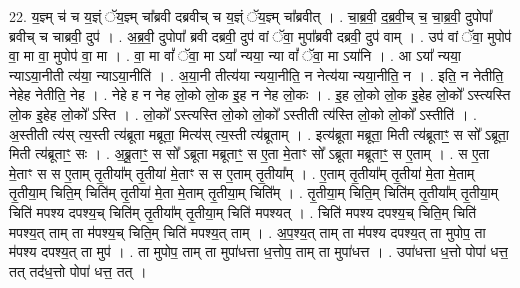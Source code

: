 \documentclass[17pt]{extarticle}
\begin{document}
22. य॒ज्ञ्म् च॑ च य॒ज्ञ्ं ॅय॒ज्ञ्म् चा᳚ब्रवी दब्रवीच् च य॒ज्ञ्ं ॅय॒ज्ञ्म् चा᳚ब्रवीत् । . चा॒ब्र॒वी॒ द॒ब्र॒वी॒च् च॒ चा॒ब्र॒वी॒ दुपोपा᳚ ब्रवीच् च चाब्रवी॒ दुप॑ । . अ॒ब्र॒वी॒ दुपोपा᳚ ब्रवी दब्रवी॒ दुप॑ वां ॅवा॒ मुपा᳚ब्रवी दब्रवी॒ दुप॑ वाम् । . उप॑ वां ॅवा॒ मुपोप॑ वा॒ मा वा॒ मुपोप॑ वा॒ मा । . वा॒ मा वां᳚ ॅवा॒ मा ऽया᳚ न्यया॒ न्या वां᳚ ॅवा॒ मा ऽया॑नि । . आ ऽया᳚ न्यया॒ न्याऽया॒नीती त्य॑या॒ न्याऽया॒नीति॑ । . अ॒या॒नी तीत्य॑या न्यया॒नीति॒ न नेत्य॑या न्यया॒नीति॒ न । . इति॒ न नेतीति॒ नेहेह नेतीति॒ नेह । . नेहे ह न नेह लो॒को लो॒क इ॒ह न नेह लो॒कः । . इ॒ह लो॒को लो॒क इ॒हेह लो॒को᳚ ऽस्त्यस्ति लो॒क इ॒हेह लो॒को᳚ ऽस्ति । . लो॒को᳚ ऽस्त्यस्ति लो॒को लो॒को᳚ ऽस्तीती त्य॑स्ति लो॒को लो॒को᳚ ऽस्तीति॑ । . अ॒स्तीती त्य॑स् त्य॒स्ती त्य॑ब्रूता मब्रूता॒ मित्य॑स् त्य॒स्ती त्य॑ब्रूताम् । . इत्य॑ब्रूता मब्रूता॒ मिती त्य॑ब्रूताꣳ॒॒ स सो᳚ ऽब्रूता॒ मिती त्य॑ब्रूताꣳ॒॒ सः । . अ॒ब्रू॒ताꣳ॒॒ स सो᳚ ऽब्रूता मब्रूताꣳ॒॒ स ए॒ता मे॒ताꣳ सो᳚ ऽब्रूता मब्रूताꣳ॒॒ स ए॒ताम् । . स ए॒ता मे॒ताꣳ स स ए॒ताम् तृ॒तीया᳚म् तृ॒तीया॑ मे॒ताꣳ स स ए॒ताम् तृ॒तीया᳚म् । . ए॒ताम् तृ॒तीया᳚म् तृ॒तीया॑ मे॒ता मे॒ताम् तृ॒तीया॒म् चिति॒म् चिति॑म् तृ॒तीया॑ मे॒ता मे॒ताम् तृ॒तीया॒म् चिति᳚म् । . तृ॒तीया॒म् चिति॒म् चिति॑म् तृ॒तीया᳚म् तृ॒तीया॒म् चिति॑ मपश्य दपश्य॒च् चिति॑म् तृ॒तीया᳚म् तृ॒तीया॒म् चिति॑ मपश्यत् । . चिति॑ मपश्य दपश्य॒च् चिति॒म् चिति॑ मपश्य॒त् ताम् ता म॑पश्य॒च् चिति॒म् चिति॑ मपश्य॒त् ताम् । . अ॒प॒श्य॒त् ताम् ता म॑पश्य दपश्य॒त् ता मुपोप॒ ता म॑पश्य दपश्य॒त् ता मुप॑ । . ता मुपोप॒ ताम् ता मुपा॑धत्ता ध॒त्तोप॒ ताम् ता मुपा॑धत्त । . उपा॑धत्ता ध॒त्तो पोपा॑ धत्त॒ तत् तद॑ध॒त्तो पोपा॑ धत्त॒ तत् । \newline
\end{document}

